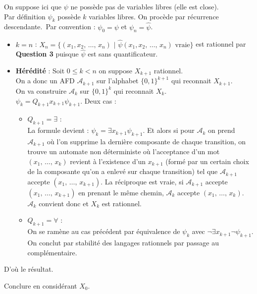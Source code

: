 \documentclass[12pt,letterpaper,boxed]{hmcpset}
\begin{document}
\begin{solution}
On suppose ici que $\psi$ ne possède pas de variables libres (elle est close). \\
Par définition $\psi_{k}$ possède $k$ variables libres. On procède par récurrence descendante. Par convention : $\psi_{0} = \psi$ et $\psi_{n} = \hat \psi$.
\begin{itemize}
\item $k=n$ : $ X_{n} = \{(x_{1}, x_{2}, \, \dots , \, x_{n}) \, \, | \, \, \hat \psi(x_{1}, x_{2}, \, \dots , \, x_{n}) \text{ vraie} \}$ est rationnel par \textbf{Question 3} puisque $\hat \psi$ est sans quantificateur.
\item \textbf{Hérédité} : Soit $0 \leq k < n $ on suppose $X_{k+1}$ rationnel. \\ On a donc un AFD $\mathcal{A}_{k+1}$ sur l'alphabet $\{0,1\}^{k+1}$ qui reconnait $X_{k+1}$. \\
On va construire $\mathcal{A}_{k}$ sur  $\{0,1\}^{k}$ qui reconnait $X_{k}$.
\\
$ \psi_k = Q_{k+1}x_{k+1} \psi_{k+1}$. Deux cas :

\begin{itemize}
\item $Q_{k+1} = \exists$ : \\ La formule devient : $ \psi_k = \exists x_{k+1} \psi_{k+1}$. Et alors si pour $\mathcal{A}_{k}$ on prend $\mathcal{A}_{k+1}$ où l'on supprime la dernière composante de chaque transition, on trouve un automate non déterministe où l'acceptance d'un mot $(x_{1},\, \dots, \, x_{k})$ revient à l'existence d'un $x_{k+1}$ (formé par un certain choix de la composante qu'on a enlevé sur chaque transition) tel que $\mathcal{A}_{k+1}$ accepte $(x_{1},\, \dots, \, x_{k+1})$. La réciproque est vraie, si $\mathcal{A}_{k+1}$ accepte $(x_{1},\, \dots, \, x_{k+1})$ en prenant le même chemin, $\mathcal{A}_{k}$ accepte $(x_{1},\, \dots, \, x_{k})$.  $\mathcal{A}_{k}$ convient donc et $X_{k}$ est rationnel.
\item $Q_{k+1} = \forall$ : \\ On se ramène au cas précédent par équivalence de $\psi_{k}$ avec $\neg \exists x_{k+1} \neg \psi_{k+1}$. On conclut par stabilité des langages rationnels par passage au complémentaire.
\end{itemize}
\end{itemize}
D'où le résultat.
\end{solution}

\begin{problem}[Question 5]
Conclure en considérant $X_{0}$.
\end{problem}
\end{document}
